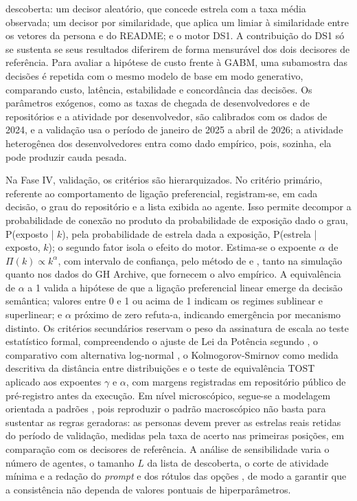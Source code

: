 \documentclass[12pt,oneside,a4paper,brazil,sumario=tradicional]{abntex2}
\begin{document}
descoberta: um decisor aleatório, que concede estrela com a taxa média observada; um decisor por similaridade, que aplica um limiar à similaridade entre os vetores da persona e do README; e o motor DS1. A contribuição do DS1 só se sustenta se seus resultados diferirem de forma mensurável dos dois decisores de referência. Para avaliar a hipótese de custo frente à GABM, uma subamostra das decisões é repetida com o mesmo modelo de base em modo generativo, comparando custo, latência, estabilidade e concordância das decisões. Os parâmetros exógenos, como as taxas de chegada de desenvolvedores e de repositórios e a atividade por desenvolvedor, são calibrados com os dados de 2024, e a validação usa o período de janeiro de 2025 a abril de 2026; a atividade heterogênea dos desenvolvedores entra como dado empírico, pois, sozinha, ela pode produzir cauda pesada.

Na Fase IV, validação, os critérios são hierarquizados. No critério primário, referente ao comportamento de ligação preferencial, registram-se, em cada decisão, o grau do repositório e a lista exibida ao agente. Isso permite decompor a probabilidade de conexão no produto da probabilidade de exposição dado o grau, P(exposto | $k$), pela probabilidade de estrela dada a exposição, P(estrela | exposto, $k$); o segundo fator isola o efeito do motor. Estima-se o expoente $\alpha$ de $\Pi(k) \propto k^{\alpha}$, com intervalo de confiança, pelo método de \textcite{newman2001} e \textcite{jeong2003}, tanto na simulação quanto nos dados do GH Archive, que fornecem o alvo empírico. A equivalência de $\alpha$ a 1 valida a hipótese de que a ligação preferencial linear emerge da decisão semântica; valores entre 0 e 1 ou acima de 1 indicam os regimes sublinear e superlinear; e $\alpha$ próximo de zero refuta-a, indicando emergência por mecanismo distinto. Os critérios secundários reservam o peso da assinatura de escala ao teste estatístico formal, compreendendo o ajuste de Lei da Potência segundo \textcite{clauset2009}, o comparativo com alternativa log-normal \parencite{broido2019}, o Kolmogorov-Smirnov como medida descritiva da distância entre distribuições e o teste de equivalência TOST aplicado aos expoentes $\gamma$ e $\alpha$, com margens registradas em repositório público de pré-registro antes da execução. Em nível microscópico, segue-se a modelagem orientada a padrões \parencite{grimm2005}, pois reproduzir o padrão macroscópico não basta para sustentar as regras geradoras: as personas devem prever as estrelas reais retidas do período de validação, medidas pela taxa de acerto nas primeiras posições, em comparação com os decisores de referência. A análise de sensibilidade varia o número de agentes, o tamanho $L$ da lista de descoberta, o corte de atividade mínima e a redação do \textit{prompt} e dos rótulos das opções \parencite{azizi2026labelsoverridedefinitionsjevstyle}, de modo a garantir que a consistência não dependa de valores pontuais de hiperparâmetros.
\end{document}
